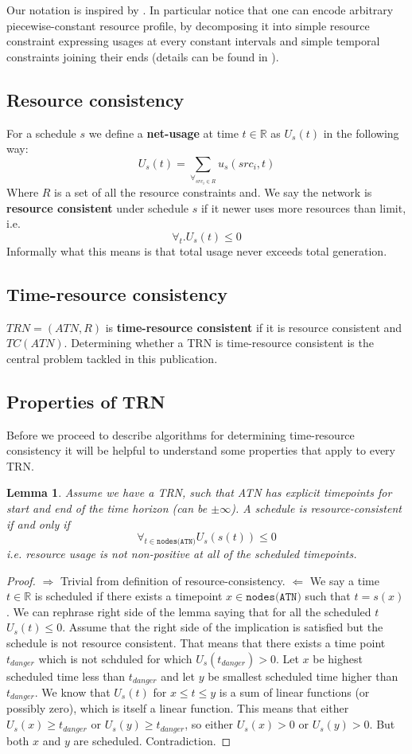 \documentclass{article}
\newtheorem{lemma}[theorem]{Lemma}
\begin{document}
\begin{multicols}{2}
Our notation is inspired by \cite{bartusch1988scheduling}. In particular notice that one can encode arbitrary piecewise-constant resource profile, by decomposing it into simple resource constraint expressing usages at every constant intervals and simple temporal constraints joining their ends (details can be found in \cite{bartusch1988scheduling}).


\subsection{Resource consistency}
For a schedule $s$ we define a \textbf{net-usage} at time $t \in \mathbb{R}$ as $U_s(t)$ in the following way:
\[
U_s(t) = \sum_{\forall_{src_i \in R}} u_s(src_i, t)
\]
Where $R$ is a set of all the resource constraints and. We say the network is \textbf{resource consistent} under schedule $s$ if it newer uses more resources than limit, i.e.
\[
\forall_{t} . U_s(t) \leq 0
\]
Informally what this means is that total usage never exceeds total generation.
\subsection{Time-resource consistency}
$TRN=(ATN, R)$ is \textbf{time-resource consistent} if it is resource consistent and $TC(ATN)$. Determining whether a TRN is time-resource consistent is the central problem tackled in this publication.

\subsection{Properties of TRN}
Before we proceed to describe algorithms for determining time-resource consistency it will be helpful to understand some properties that apply to every TRN.
\begin{lemma}
\label{resource_checking}
Assume we have a TRN, such that ATN has explicit timepoints for start and end of the time horizon (can be $\pm \infty$).
A schedule is resource-consistent if and only if
\[
\forall_{t \in \texttt{nodes(ATN)}} U_s(s(t)) \leq 0
\]
i.e. resource usage is not non-positive at all of the scheduled timepoints.
\end{lemma}
\begin{proof}
$\Rightarrow$ Trivial from definition of resource-consistency.
$\Leftarrow$ We say a time $t \in \mathbb{R}$ is scheduled if there exists a timepoint  $x \in \texttt{nodes(ATN)}$ such that $t = s(x)$. We can rephrase right side of the lemma saying that for all the scheduled $t$ $U_s(t) \leq 0$. Assume that the right side of the implication is satisfied but the schedule is not resource consistent. That means that there exists a time point $t_{danger}$ which is not schduled for which $U_s(t_{danger}) > 0 $. Let $x$ be highest scheduled time less than $t_{danger}$ and let $y$ be smallest scheduled time higher than $t_{danger}$. We know that $U_s(t)$ for $x \leq t \leq y$ is a sum of linear functions (or possibly zero), which is itself a linear function. This means that either $U_s(x) \geq t_{danger}$ or $U_s(y) \geq t_{danger}$, so either $U_s(x) > 0$ or $U_s(y) > 0$. But both $x$ and $y$ are scheduled. Contradiction.


\end{proof}
\end{multicols}
\end{document}
